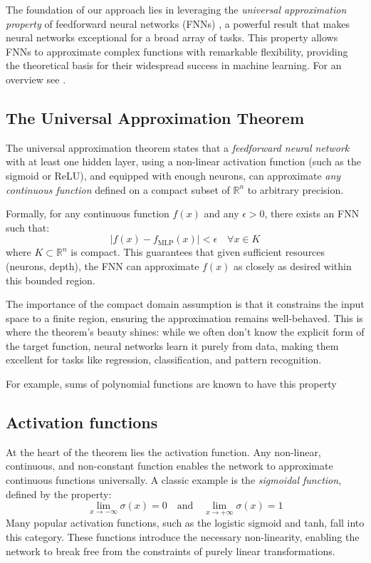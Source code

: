 \documentclass{article}
\theoremstyle{definition}
\theoremstyle{remark}
\newcounter{ct}
\begin{document}
The foundation of our approach lies in leveraging the \textit{universal approximation property} of feedforward neural networks (FNNs) \citep{poggio1990networks}, a powerful result that makes neural networks exceptional for a broad array of tasks. This property allows FNNs to approximate complex functions with remarkable flexibility, providing the theoretical basis for their widespread success in machine learning.
For an overview see \citep{blum1991approximation,scarselli1998universal,augustine2024survey}.





\subsection{The Universal Approximation Theorem}
The universal approximation theorem states that a \textit{feedforward neural network} with at least one hidden layer, using a non-linear activation function (such as the sigmoid or ReLU), and equipped with enough neurons, can approximate \textit{any continuous function} defined on a compact subset of \(\mathbb{R}^n\) to arbitrary precision.

Formally, for any continuous function \(f(x)\) and any \(\epsilon > 0\), there exists an FNN such that:
\[
| f(x) - f_{\text{MLP}}(x) | < \epsilon \quad \forall x \in K
\]
where \(K \subset \mathbb{R}^n\) is compact. This guarantees that given sufficient resources (neurons, depth), the FNN can approximate \(f(x)\) as closely as desired within this bounded region.

The importance of the compact domain assumption is that it constrains the input space to a finite region, ensuring the approximation remains well-behaved.	
This is where the theorem’s beauty shines: while we often don’t know the explicit form of the target function, neural networks learn it purely from data, making them excellent for tasks like regression, classification, and pattern recognition.

 For example, sums of polynomial functions are known to have this property\citep{llavona1986approximation}

\subsection{Activation functions} %
At the heart of the theorem lies the activation function. Any non-linear, continuous, and non-constant function enables the network to approximate continuous functions universally.
A classic example is the \textit{sigmoidal function}, defined by the property:
\[
\lim_{x \to -\infty} \sigma(x) = 0 \quad \text{and} \quad \lim_{x \to +\infty} \sigma(x) = 1
\]
Many popular activation functions, such as the logistic sigmoid and tanh, fall into this category.
These functions introduce the necessary non-linearity, enabling the network to break free from the constraints of purely linear transformations.
\end{document}
